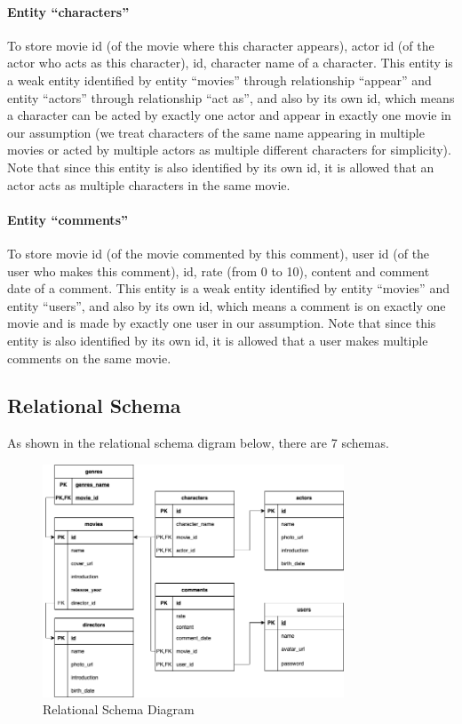 \begin{CJK*}{UTF8}{gbsn}
\paragraph{Entity ``characters''}
To store movie id (of the movie where this character appears), actor id (of the actor who acts as this character), id, character name of a character. This entity is a weak entity identified by entity ``movies'' through relationship ``appear'' and entity ``actors'' through relationship ``act as'', and also by its own id, which means a character can be acted by exactly one actor and appear in exactly one movie in our assumption (we treat characters of the same name appearing in multiple movies or acted by multiple actors as multiple different characters for simplicity). Note that since this entity is also identified by its own id, it is allowed that an actor acts as multiple characters in the same movie. 
\paragraph{Entity ``comments''}
To store movie id (of the movie commented by this comment), user id (of the user who makes this comment), id, rate (from 0 to 10), content and comment date of a comment. This entity is a weak entity identified by entity ``movies'' and entity ``users'', and also by its own id, which means a comment is on exactly one movie and is made by exactly one user in our assumption. Note that since this entity is also identified by its own id, it is allowed that a user makes multiple comments on the same movie. 

\subsection{Relational Schema}
As shown in the relational schema digram below, there are 7 schemas. 
\begin{figure}[h]
\centering
\includegraphics[width=0.8\textwidth]{schema.png}
\caption{Relational Schema Diagram}
\end{figure}


\end{CJK*}
